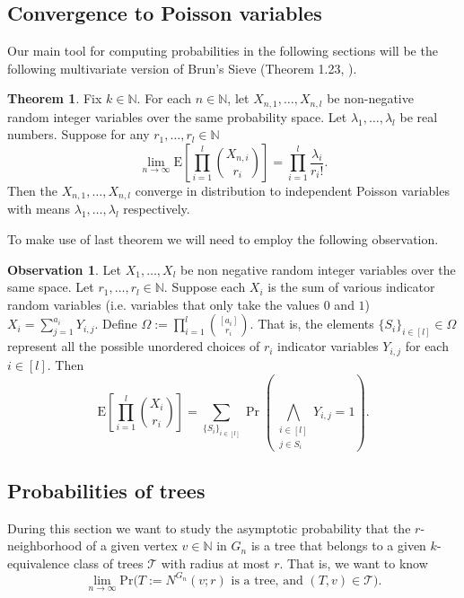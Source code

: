 \documentclass[12pt,notitlepage,a4paper]{article}
\theoremstyle{definition}
\newtheorem{theorem}{Theorem}[section]
\newtheorem{obs}{Observation}[section]
\newcommand{\N}{\mathbb{N}}
\newcommand{\Ln}{\lim\limits_{n\to \infty}}
\begin{document}
\subsection{Convergence to Poisson variables}

Our main tool for computing probabilities in the following sections
will be the following multivariate version of Brun's Sieve 
(Theorem 1.23, \cite{bollobas2001random}).


\begin{theorem} \label{thm:BrunSieve}
	Fix $k\in \N$. For each 
	$n\in \N$, let $X_{n,1},\dots, X_{n,l}$ be non-negative
	random integer variables over the same
	probability space. Let $\lambda_1,\dots,\lambda_l$ 
	be real numbers. Suppose for any $r_1,\dots,r_l \in \N$
	\[ 
	\Ln \mathrm{E}\left[
	\prod_{i=1}^{l} \binom{X_{n,i}}{r_i} \right]
	= \prod_{i=1}^{l} \frac{\lambda_i}{r_i !}.	
	\]
	Then the $X_{n,1},\dots,X_{n,l}$ converge in distribution to
	independent Poisson variables with means $\lambda_1,\dots,\lambda_l$ 
	respectively. 
\end{theorem}

To make use of last theorem we will need to employ the following observation.

\begin{obs} \label{obs:binomialmean} Let $X_1,\dots, X_l$ be non negative
	random integer variables over the same space. 
	Let $r_1,\dots,r_l\in \N$.	Suppose
	each $X_i$ is the sum of various indicator random variables
	(i.e. variables that only take the values $0$ and $1$)
	$X_i=\sum_{j=1}^{a_i} Y_{i,j}$. Define 
	$\Omega:=\prod_{i=1}^l \binom{[a_i]}{r_i}$. That is,
	the elements $\{S_i\}_{i\in[l]}\in \Omega$
	represent all the possible unordered choices of 
	$r_i$ indicator variables $Y_{i,j}$ for each $i\in [l]$.
	Then 
	\[
	\mathrm{E}\left[
	\prod_{i=1}^{l} \binom{X_i}{r_i}\right]=
	\sum_{\{S_i\}_{i\in [l]}} \Pr\left(
	\bigwedge_{\substack{i\in [l]\\ j\in S_i}} Y_{i,j}=1
	\right).	
	\]
\end{obs} 



\subsection{Probabilities of trees}

During this section we want to study
the asymptotic probability that the 
$r$-neighborhood of a given vertex $v\in \N$
in $G_n$ 
is a tree that belongs to a given $k$-equivalence
class of trees $\mathcal{T}$ with radius at most
$r$. That is, we want to know
\[\Ln \mathrm{Pr}\big( 
T:=N^{G_n}(v;r) \text{ is a tree, and } (T,v)\in \mathcal{T} \big). 
\]
\end{document}
